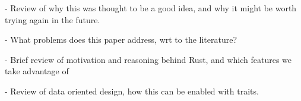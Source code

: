 - Review of why this was thought to be a good idea, and why it might be worth trying again in the future.

- What problems does this paper address, wrt to the literature?

- Brief review of motivation and reasoning behind Rust, and which features we take advantage of

- Review of data oriented design, how this can be enabled with traits.

% 
% 
% 
% 
